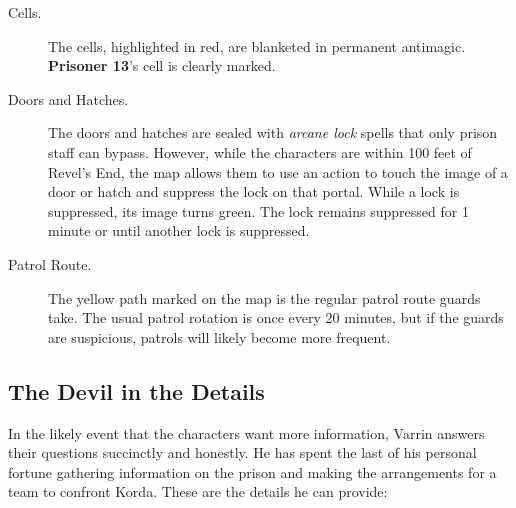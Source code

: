 \documentclass[10pt,a4paper,twoside,bg=print,twocolumn,openany,nodeprecatedcode]{dndbook}
\begin{document}
\begin{description}
\item[Cells.]
The cells, highlighted in red, are blanketed in permanent antimagic. \textbf{Prisoner 13}'s cell is clearly marked.
\item[Doors and Hatches.]
The doors and hatches are sealed with \textit{arcane lock} spells that only prison staff can bypass. However, while the characters are within 100 feet of Revel's End, the map allows them to use an action to touch the image of a door or hatch and suppress the lock on that portal. While a lock is suppressed, its image turns green. The lock remains suppressed for 1 minute or until another lock is suppressed.
\item[Patrol Route.]
The yellow path marked on the map is the regular patrol route guards take. The usual patrol rotation is once every 20 minutes, but if the guards are suspicious, patrols will likely become more frequent.
\end{description}

\subsection{The Devil in the Details}
In the likely event that the characters want more information, Varrin answers their questions succinctly and honestly. He has spent the last of his personal fortune gathering information on the prison and making the arrangements for a team to confront Korda. These are the details he can provide:
\end{document}
